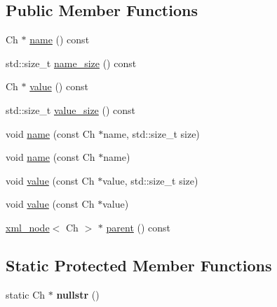 \subsection*{Public Member Functions}
\begin{DoxyCompactItemize}
\item 
Ch $\ast$ \hyperlink{classrapidxml_1_1xml__base_a9a09739310469995db078ebd0da3ed45}{name} () const 
\item 
std\+::size\+\_\+t \hyperlink{classrapidxml_1_1xml__base_a7e7f98b3d01e1eab8dc1ca69aad9af84}{name\+\_\+size} () const 
\item 
Ch $\ast$ \hyperlink{classrapidxml_1_1xml__base_adcdaccff61c665f039d9344e447b7445}{value} () const 
\item 
std\+::size\+\_\+t \hyperlink{classrapidxml_1_1xml__base_a9fcf201ed0915ac18dd43b0b5dcfaf32}{value\+\_\+size} () const 
\item 
void \hyperlink{classrapidxml_1_1xml__base_ae55060ae958c6e6465d6c8db852ec6ce}{name} (const Ch $\ast$name, std\+::size\+\_\+t size)
\item 
void \hyperlink{classrapidxml_1_1xml__base_a4611ddc82ac83a527c65606600eb2a0d}{name} (const Ch $\ast$name)
\item 
void \hyperlink{classrapidxml_1_1xml__base_a3b183c2db7022a6d30494dd2f0ac11e9}{value} (const Ch $\ast$value, std\+::size\+\_\+t size)
\item 
void \hyperlink{classrapidxml_1_1xml__base_a81e63ec4bfd2d7ef0a6c2ed49be6e623}{value} (const Ch $\ast$value)
\item 
\hyperlink{classrapidxml_1_1xml__node}{xml\+\_\+node}$<$ Ch $>$ $\ast$ \hyperlink{classrapidxml_1_1xml__base_a7f31ae930f93852830234db1ae59c4c4}{parent} () const 
\end{DoxyCompactItemize}
\subsection*{Static Protected Member Functions}
\begin{DoxyCompactItemize}
\item 
static Ch $\ast$ {\bfseries nullstr} ()\hypertarget{classrapidxml_1_1xml__base_ad96ff6b1e41dab3ff60b9bc4df769a75}{}\label{classrapidxml_1_1xml__base_ad96ff6b1e41dab3ff60b9bc4df769a75}

\end{DoxyCompactItemize}
